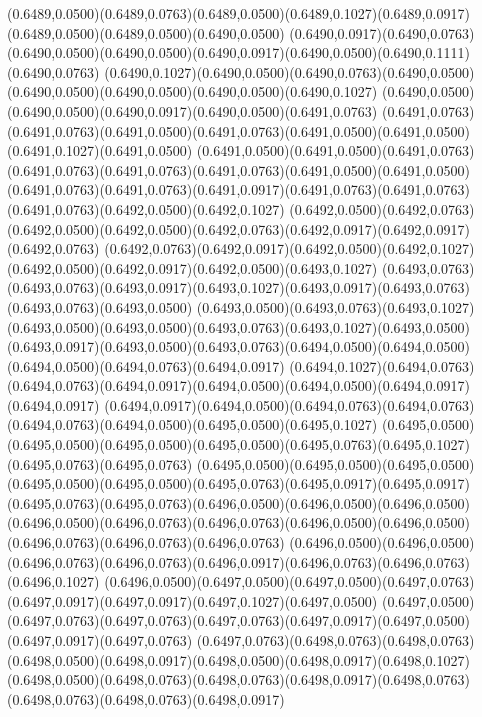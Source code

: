 (0.6489,0.0500)(0.6489,0.0763)(0.6489,0.0500)(0.6489,0.1027)(0.6489,0.0917)(0.6489,0.0500)(0.6489,0.0500)(0.6490,0.0500)
(0.6490,0.0917)(0.6490,0.0763)(0.6490,0.0500)(0.6490,0.0500)(0.6490,0.0917)(0.6490,0.0500)(0.6490,0.1111)(0.6490,0.0763)
(0.6490,0.1027)(0.6490,0.0500)(0.6490,0.0763)(0.6490,0.0500)(0.6490,0.0500)(0.6490,0.0500)(0.6490,0.0500)(0.6490,0.1027)
(0.6490,0.0500)(0.6490,0.0500)(0.6490,0.0917)(0.6490,0.0500)(0.6491,0.0763)
\PST@Solid(0.6491,0.0763)(0.6491,0.0763)(0.6491,0.0500)(0.6491,0.0763)(0.6491,0.0500)(0.6491,0.0500)(0.6491,0.1027)(0.6491,0.0500)
(0.6491,0.0500)(0.6491,0.0500)(0.6491,0.0763)(0.6491,0.0763)(0.6491,0.0763)(0.6491,0.0763)(0.6491,0.0500)(0.6491,0.0500)
(0.6491,0.0763)(0.6491,0.0763)(0.6491,0.0917)(0.6491,0.0763)(0.6491,0.0763)(0.6491,0.0763)(0.6492,0.0500)(0.6492,0.1027)
(0.6492,0.0500)(0.6492,0.0763)(0.6492,0.0500)(0.6492,0.0500)(0.6492,0.0763)(0.6492,0.0917)(0.6492,0.0917)(0.6492,0.0763)
(0.6492,0.0763)(0.6492,0.0917)(0.6492,0.0500)(0.6492,0.1027)(0.6492,0.0500)(0.6492,0.0917)(0.6492,0.0500)(0.6493,0.1027)
(0.6493,0.0763)(0.6493,0.0763)(0.6493,0.0917)(0.6493,0.1027)(0.6493,0.0917)(0.6493,0.0763)(0.6493,0.0763)(0.6493,0.0500)
(0.6493,0.0500)(0.6493,0.0763)(0.6493,0.1027)(0.6493,0.0500)(0.6493,0.0500)(0.6493,0.0763)(0.6493,0.1027)(0.6493,0.0500)
(0.6493,0.0917)(0.6493,0.0500)(0.6493,0.0763)(0.6494,0.0500)(0.6494,0.0500)(0.6494,0.0500)(0.6494,0.0763)(0.6494,0.0917)
(0.6494,0.1027)(0.6494,0.0763)(0.6494,0.0763)(0.6494,0.0917)(0.6494,0.0500)(0.6494,0.0500)(0.6494,0.0917)(0.6494,0.0917)
(0.6494,0.0917)(0.6494,0.0500)(0.6494,0.0763)(0.6494,0.0763)(0.6494,0.0763)(0.6494,0.0500)(0.6495,0.0500)(0.6495,0.1027)
(0.6495,0.0500)(0.6495,0.0500)(0.6495,0.0500)(0.6495,0.0500)(0.6495,0.0763)(0.6495,0.1027)(0.6495,0.0763)(0.6495,0.0763)
(0.6495,0.0500)(0.6495,0.0500)(0.6495,0.0500)(0.6495,0.0500)(0.6495,0.0500)(0.6495,0.0763)(0.6495,0.0917)(0.6495,0.0917)
(0.6495,0.0763)(0.6495,0.0763)(0.6496,0.0500)(0.6496,0.0500)(0.6496,0.0500)
\PST@Solid(0.6496,0.0500)(0.6496,0.0763)(0.6496,0.0763)(0.6496,0.0500)(0.6496,0.0500)(0.6496,0.0763)(0.6496,0.0763)(0.6496,0.0763)
(0.6496,0.0500)(0.6496,0.0500)(0.6496,0.0763)(0.6496,0.0763)(0.6496,0.0917)(0.6496,0.0763)(0.6496,0.0763)(0.6496,0.1027)
(0.6496,0.0500)(0.6497,0.0500)(0.6497,0.0500)(0.6497,0.0763)(0.6497,0.0917)(0.6497,0.0917)(0.6497,0.1027)(0.6497,0.0500)
(0.6497,0.0500)(0.6497,0.0763)(0.6497,0.0763)(0.6497,0.0763)(0.6497,0.0917)(0.6497,0.0500)(0.6497,0.0917)(0.6497,0.0763)
(0.6497,0.0763)(0.6498,0.0763)(0.6498,0.0763)(0.6498,0.0500)(0.6498,0.0917)(0.6498,0.0500)(0.6498,0.0917)(0.6498,0.1027)
(0.6498,0.0500)(0.6498,0.0763)(0.6498,0.0763)(0.6498,0.0917)(0.6498,0.0763)(0.6498,0.0763)(0.6498,0.0763)(0.6498,0.0917)
